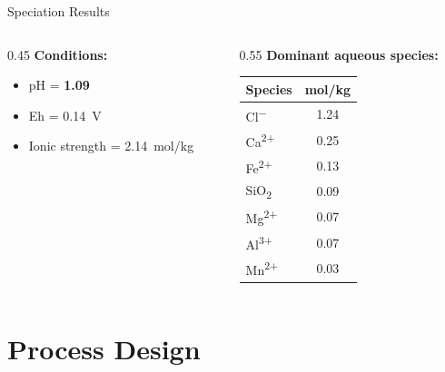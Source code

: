 \documentclass[aspectratio=169]{beamer}
\begin{document}
\begin{frame}{Speciation Results}

\begin{columns}[T]
\begin{column}{0.45\textwidth}
\textbf{Conditions:}
\begin{itemize}
  \item pH = \textbf{1.09}
  \item Eh = \SI{0.14}{V}
  \item Ionic strength = \SI{2.14}{mol/kg}
\end{itemize}
\end{column}
\begin{column}{0.55\textwidth}
\textbf{Dominant aqueous species:}

\begin{tabular}{lc}
\toprule
\textbf{Species} & \textbf{mol/kg} \\
\midrule
Cl\textsuperscript{$-$} & 1.24 \\
Ca\textsuperscript{2+}  & 0.25 \\
Fe\textsuperscript{2+}  & 0.13 \\
SiO\textsubscript{2}    & 0.09 \\
Mg\textsuperscript{2+}  & 0.07 \\
Al\textsuperscript{3+}  & 0.07 \\
Mn\textsuperscript{2+}  & 0.03 \\
\bottomrule
\end{tabular}
\end{column}
\end{columns}
\end{frame}

\section{Process Design}
\end{document}
